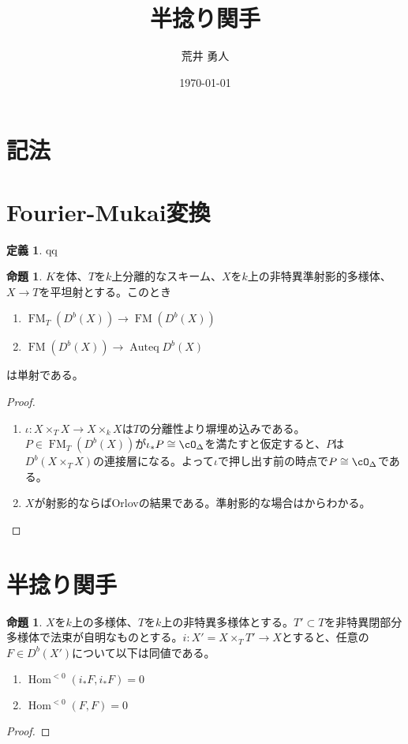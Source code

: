 \documentclass[uplatex, a4paper, dvipdfmx]{jsarticle}
\title{半捻り関手}
\author{荒井 勇人}
\date{\today}
\theoremstyle{definition}
\newtheorem{definition}[theorem]{定義}
\newtheorem{proposition}[theorem]{命題}
\DeclareMathOperator{\Hom}{\mathrm{Hom}}
\DeclareMathOperator{\Auteq}{\mathrm{Auteq}}
\DeclareMathOperator{\FM}{\mathrm{FM}}
\begin{document}
\maketitle
\section{記法}
\section{Fourier-Mukai変換}
\begin{definition}
    qq
\end{definition}
\begin{proposition}
    $K$を体、$T$を$k$上分離的なスキーム、$X$を$k$上の非特異準射影的多様体、$X \to T$を平坦射とする。このとき
    \begin{enumerate}
        \item $\FM_{T}(D^b(X)) \to \FM(D^b(X))$
        \item $\FM (D^b(X)) \to \Auteq D^b(X)$
    \end{enumerate}
    は単射である。
\end{proposition}
\begin{proof}
    \begin{enumerate}
        \item $\iota \colon X \times_T X \to X \times_k X$は$T$の分離性より塀埋め込みである。$P \in \FM_T (D^b(X))$が$\iota_*P \cong \cO_\Delta$を満たすと仮定すると、$P$は$D^b(X \times_T X)$の連接層になる。よって$\iota$で押し出す前の時点で$P \cong \cO_\Delta$である。
        \item $X$が射影的ならばOrlovの結果である。準射影的な場合は\cite[Theorem 1.5]{MR3556457}からわかる。
    \end{enumerate}
\end{proof}
\section{半捻り関手}
\begin{proposition}
    $X$を$k$上の多様体、$T$を$k$上の非特異多様体とする。$T' \subset T$を非特異閉部分多様体で法束が自明なものとする。$i \colon X' = X \times_T T' \to X$とすると、任意の$F \in D^b(X')$について以下は同値である。
    \begin{enumerate}
        \item $\Hom^{<0}(i_*F, i_*F) = 0$
        \item $\Hom^{<0}(F, F) = 0$
    \end{enumerate}
\end{proposition}
\begin{proof}

\end{proof}
\printbibliography[title=参考文献]
\end{document}
